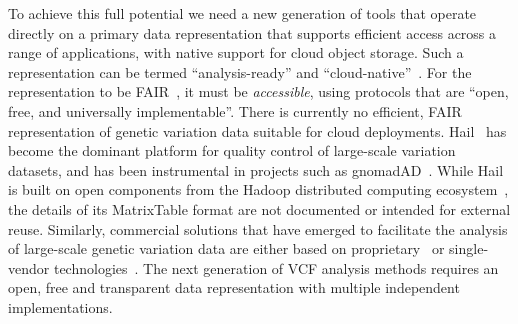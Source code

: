 \documentclass[a4paper,num-refs]{oup-contemporary}
\begin{document}
To achieve this full potential we
need a new generation of tools that operate directly
on a primary data representation that supports
efficient access across a range of applications,
with native support for cloud object storage.
Such a representation can be termed ``analysis-ready''
and ``cloud-native''~\citep{abernathey2021cloud}.
For the representation to be FAIR~\citep{wilkinson2016fair},
it must be \emph{accessible}, using protocols that are
``open, free, and universally implementable''.
There is currently no efficient, FAIR representation of genetic variation
data suitable for cloud deployments.
Hail~\cite{ganna2016ultra,hail2024} has become the dominant platform
for quality control of large-scale variation datasets,
and has been instrumental in projects such as
gnomadAD~\cite{karczewski2020mutational,chen2024genomic}.
While Hail is built on open components
from the Hadoop distributed computing ecosystem~\citep{white2012hadoop},
the details of its MatrixTable format are not documented
or intended for external reuse.
Similarly, commercial solutions that have emerged to facilitate
the analysis of large-scale genetic variation data are either
based on proprietary~\cite{basespace2024,graf2024,googlelifesciences2024,
awshealthomics2024,microsoftgenomics2024}
or single-vendor technologies~\cite[e.g.][]{tiledb2024,genomicsdb2024}.
The next generation of VCF analysis methods requires
an open, free and transparent data representation
with multiple independent implementations.
\end{document}
